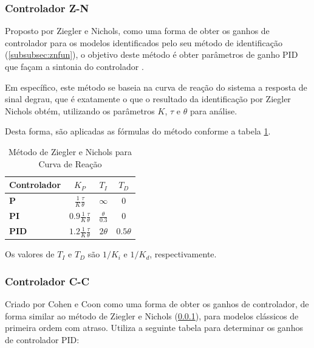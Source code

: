 \subsubsection{Controlador Z-N}\label{subsubsec:znctr}

Proposto por Ziegler e Nichols, como uma forma de obter os ganhos de controlador para os modelos identificados
pelo seu método de identificação (\ref{subsubsec:znfun}), o objetivo deste método é obter parâmetros de ganho PID que
façam a sintonia do controlador \cite{apostpidsint}.

Em específico, este método se baseia na curva de reação do sistema a resposta de sinal degrau, que é
exatamente o que o resultado da identificação por Ziegler Nichols obtém, utilizando os parâmetros $K$, $\tau$ e $\theta$
para análise.

Desta forma, são aplicadas as fórmulas do método conforme a tabela \ref{tab:zncntb}.

\begin{table}[h]
    \begin{center}
        \begin{tabular}{ | l | c | c | c | }
            \hline
            {\textbf{Controlador}} & {$K_P$}                               & {$T_I$}                & {$T_D$}       \\
            \hline
            {\textbf{P}}           & {$\frac{1}{K}\frac{\tau}{\theta}$}    & {$\infty$}             & {$0$}         \\
            \hline
            {\textbf{PI}}          & {$0.9\frac{1}{K}\frac{\tau}{\theta}$} & {$\frac{\theta}{0.3}$} & {$0$}         \\
            \hline
            {\textbf{PID}}         & {$1.2\frac{1}{K}\frac{\tau}{\theta}$} & {$2\theta$}            & {$0.5\theta$} \\
            \hline
        \end{tabular}
        \caption{Método de Ziegler e Nichols para Curva de Reação}
        \label{tab:zncntb}
    \end{center}
\end{table}

Os valores de $T_I$ e $T_D$ são $1/K_i$ e $1/K_d$, respectivamente.

\subsubsection{Controlador C-C}\label{subsubsec:ccapx}

Criado por Cohen e Coon como uma forma de obter os ganhos de controlador, de forma similar ao método de Ziegler e Nichols
(\ref{subsubsec:znctr}), para modelos clássicos de primeira ordem com atraso.
Utiliza a seguinte tabela para determinar os ganhos de controlador PID:

